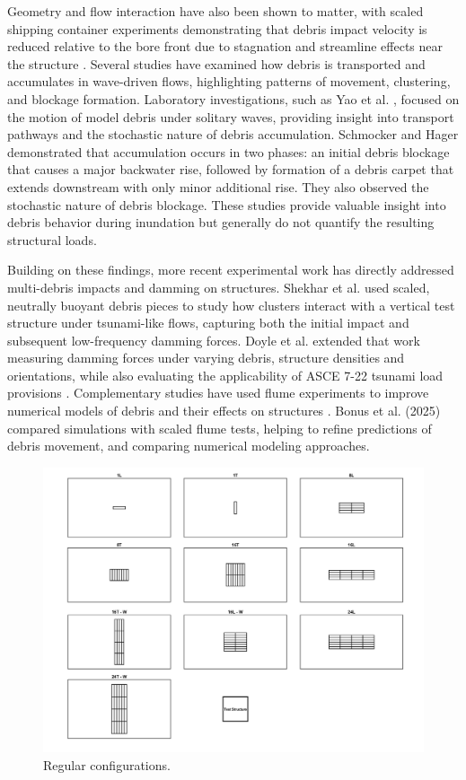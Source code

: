 \documentclass{article}
\begin{document}
Geometry and flow interaction have also been shown to matter, with scaled shipping container experiments demonstrating that debris impact velocity is reduced relative to the bore front due to stagnation and streamline effects near the structure \citep{Derschum2018}. Several studies have examined how debris is transported and accumulates in wave-driven flows, highlighting patterns of movement, clustering, and blockage formation. Laboratory investigations, such as Yao et al. \citep{Yao2014}, focused on the motion of model debris under solitary waves, providing insight into transport pathways and the stochastic nature of debris accumulation. Schmocker and Hager \citep{Schmocker2011}  demonstrated that accumulation occurs in two phases: an initial debris blockage that causes a major backwater rise, followed by formation of a debris carpet that extends downstream with only minor additional rise. They also observed the stochastic nature of debris blockage. These studies provide valuable insight into debris behavior during inundation but generally do not quantify the resulting structural loads.

Building on these findings, more recent experimental work has directly addressed multi-debris impacts and damming on structures. Shekhar et al. \citep{Shekhar2020} used scaled, neutrally buoyant debris pieces to study how  clusters interact with a vertical test structure under tsunami-like flows, capturing both the initial impact and subsequent low-frequency damming forces. Doyle et al. extended that work measuring damming forces under varying debris, structure densities and orientations, while also evaluating the applicability of ASCE 7-22 tsunami load provisions \citep{Doyle2024}. Complementary studies have used flume experiments to improve numerical models of debris and their effects on structures \citep{Bonus2022, bonusTsunamiDebrisMotion2025}. Bonus et al. (2025) compared simulations with scaled flume tests, helping to refine predictions of debris movement, and comparing numerical modeling approaches.

\begin{figure}[htbp]
    \centering
    \includegraphics[width=1.3\textwidth]{Configurations.png}
    \caption{Regular configurations.}
    \label{fig:configurations}
\end{figure}
\end{document}
